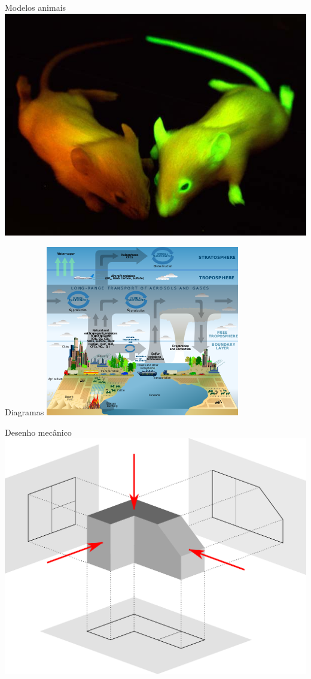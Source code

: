 \documentclass{beamer}
\begin{document}
\begin{frame}{Modelos animais}
  \centering
  \includegraphics[width=\textwidth]{modelos/GFP_hiir}
\end{frame}

\begin{frame}{Diagramas}
  \centering
  \includegraphics[height=.8\textheight]{modelos/Atmosphere_composition_diagram-en}
\end{frame}

\begin{frame}{Desenho mecânico}
  \centering
  \includegraphics[width=\textwidth]{modelos/2000px-First_angle_projection}
\end{frame}
\end{document}
